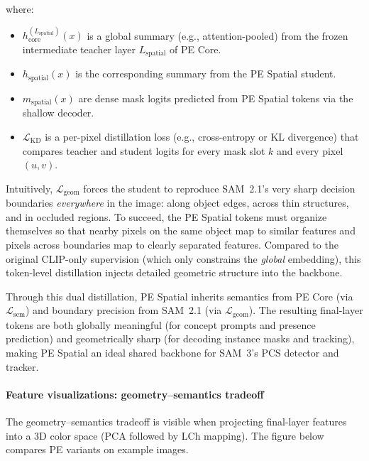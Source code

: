 \begin{enrichment}
\begin{enrichment}
\begin{itemize}
			where:
			\begin{itemize}
				\item \(h_{\text{core}}^{(L_{\text{spatial}})}(x)\) is a global summary (e.g., attention-pooled) from the frozen intermediate teacher layer \(L_{\text{spatial}}\) of PE Core.
				\item \(h_{\text{spatial}}(x)\) is the corresponding summary from the PE Spatial student.
				\item \(m_{\text{spatial}}(x)\) are dense mask logits predicted from PE Spatial tokens via the shallow decoder.
				\item \(\mathcal{L}_{\text{KD}}\) is a per-pixel distillation loss (e.g., cross-entropy or KL divergence) that compares teacher and student logits for every mask slot \(k\) and every pixel \((u,v)\).
			\end{itemize}
			
			Intuitively, \(\mathcal{L}_{\text{geom}}\) forces the student to reproduce SAM~2.1’s very sharp decision boundaries \emph{everywhere} in the image: along object edges, across thin structures, and in occluded regions. To succeed, the PE Spatial tokens must organize themselves so that nearby pixels on the same object map to similar features and pixels across boundaries map to clearly separated features. Compared to the original CLIP-only supervision (which only constrains the \emph{global} embedding), this token-level distillation injects detailed geometric structure into the backbone.
			
		\end{itemize}
		
		Through this dual distillation, PE Spatial inherits semantics from PE Core (via \(\mathcal{L}_{\text{sem}}\)) and boundary precision from SAM~2.1 (via \(\mathcal{L}_{\text{geom}}\)). The resulting final-layer tokens are both globally meaningful (for concept prompts and presence prediction) and geometrically sharp (for decoding instance masks and tracking), making PE Spatial an ideal shared backbone for SAM~3’s PCS detector and tracker.
		
		\paragraph{Feature visualizations: geometry--semantics tradeoff}
		
		The geometry--semantics tradeoff is visible when projecting final-layer features into a 3D color space (PCA followed by LCh mapping). The figure below compares PE variants on example images.
		

\end{enrichment}
\end{enrichment}
